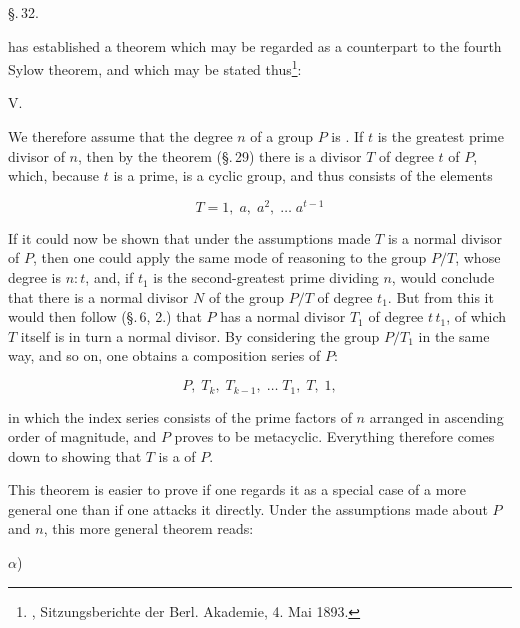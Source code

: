 \begin{center}
\S.\,32.

\end{center}

 has established a theorem which may be regarded as a counterpart to the fourth Sylow theorem, and which may be stated thus\footnote{, Sitzungsberichte der Berl. Akademie, 4. Mai 1893.}:

V. 

We therefore assume that the degree $n$ of a group $P$ is . If $t$ is the greatest prime divisor of $n$, then by the  theorem (\S.\,29) there is a divisor $T$ of degree $t$ of $P$, which, because $t$ is a prime, is a cyclic group, and thus consists of the elements

\[
T = 1, \; a, \; a^2, \; \ldots \; a^{t-1}
\]

If it could now be shown that under the assumptions made $T$ is a normal divisor of $P$, then one could apply the same mode of reasoning to the group $P/T$, whose degree is $n:t$, and, if $t_1$ is the second-greatest prime dividing $n$, would conclude that there is a normal divisor $N$ of the group $P/T$ of degree $t_1$. But from this it would then follow (\S.\,6, 2.) that $P$ has a normal divisor $T_1$ of degree $t\,t_1$, of which $T$ itself is in turn a normal divisor. By considering the group $P/T_1$ in the same way, and so on, one obtains a composition series of $P$:

\[
P, \; T_k, \; T_{k-1}, \; \ldots \; T_1, \; T, \; 1,
\]

in which the index series consists of the prime factors of $n$ arranged in ascending order of magnitude, and $P$ proves to be metacyclic. Everything therefore comes down to showing that $T$ is a  of $P$.

This theorem is easier to prove if one regards it as a special case of a more general one than if one attacks it directly. Under the assumptions made about $P$ and $n$, this more general theorem reads:

$\alpha$) 
